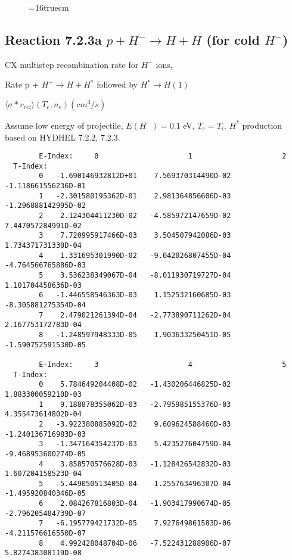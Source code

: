 \documentclass[12pt,dvipdfmx]{article}
\begin{document}
{\begin{small}
\begin{verbatim}
\end{verbatim}\end{small}
\begin{figure} \label{2.2.5mai}
\epsfxsize=16truecm
\end{figure}
\newpage

\subsection{
Reaction 7.2.3a   $ p + H^{-} \rightarrow  H + H$ (for cold $H^-$)
}
  CX multistep recombination rate for $H^-$ ions,
 \cite{kn:Sawada}

  Rate p + $H^- \rightarrow H + H^*$ followed by $H^* \rightarrow H(1)$

$  \langle \sigma*v_{rel} \rangle(T_e,n_e) (cm^3/s)$

Assume low energy of projectile, $E(H^-)=0.1$ eV, $T_e = T_i$.
$H^*$ production based on HYDHEL 7.2.2, 7.2.3.

\begin{small}\begin{verbatim}
        E-Index:     0                     1                     2
  T-Index:
        0   -1.690146932812D+01    7.569370314490D-02   -1.118661556236D-01
        1   -2.301580195362D-01    2.981364856606D-03   -1.296888142995D-02
        2    2.124304411230D-02   -4.585972147659D-02    7.447057284991D-02
        3    7.720995917466D-03    3.504507942086D-03    1.734371731330D-04
        4    1.331695301990D-02   -9.042026807455D-04   -4.764566765886D-03
        5    3.536238349067D-04   -8.011930719727D-04    1.101704458636D-03
        6   -1.446558546363D-03    1.152532160685D-03   -8.305881275354D-04
        7    2.479021261394D-04   -2.773890711262D-04    2.167753172783D-04
        8   -1.248597948333D-05    1.903633250451D-05   -1.590752591530D-05

        E-Index:     3                     4                     5
  T-Index:
        0    5.784649204408D-02   -1.430206446825D-02    1.883300059210D-03
        1    9.188878355062D-03   -2.795985155376D-03    4.355473614802D-04
        2   -3.922380885092D-02    9.609624588460D-03   -1.240136716983D-03
        3   -1.347164354237D-03    5.423527604759D-04   -9.468953600274D-05
        4    3.858570576628D-03   -1.128426542832D-03    1.607204158523D-04
        5   -5.449050513405D-04    1.255763496307D-04   -1.495920840346D-05
        6    2.084267816803D-04   -1.903417990674D-05   -2.796205484739D-07
        7   -6.195779421732D-05    7.927649861583D-06   -4.211576616550D-07
        8    4.992428048704D-06   -7.522431288906D-07    5.827438308119D-08


\end{verbatim}
\end{small}}
\end{document}
